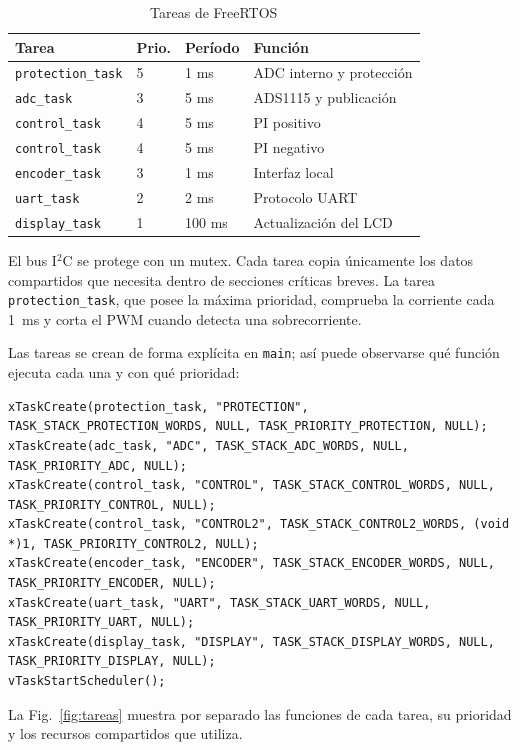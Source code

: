 \documentclass[conference]{IEEEtran}
\begin{document}
\begin{table}[!t]
\caption{Tareas de FreeRTOS}
\label{tab:tareas}
\centering
\scriptsize
\begin{tabular}{@{}llll@{}}
\toprule
\textbf{Tarea} & \textbf{Prio.} & \textbf{Período} & \textbf{Función} \\
\midrule
\texttt{protection\_task} & 5 & 1 ms & ADC interno y protección \\
\texttt{adc\_task} & 3 & 5 ms & ADS1115 y publicación \\
\texttt{control\_task} & 4 & 5 ms & PI positivo \\
\texttt{control\_task} & 4 & 5 ms & PI negativo \\
\texttt{encoder\_task} & 3 & 1 ms & Interfaz local \\
\texttt{uart\_task} & 2 & 2 ms & Protocolo UART \\
\texttt{display\_task} & 1 & 100 ms & Actualización del LCD \\
\bottomrule
\end{tabular}
\end{table}

El bus I$^2$C se protege con un mutex. Cada tarea copia únicamente los datos compartidos que necesita dentro de secciones críticas breves. La tarea \texttt{protection\_task}, que posee la máxima prioridad, comprueba la corriente cada 1~ms y corta el PWM cuando detecta una sobrecorriente.

Las tareas se crean de forma explícita en \texttt{main}; así puede observarse qué función ejecuta cada una y con qué prioridad:

\begin{lstlisting}[caption={Creación de las siete tareas del programa principal.}]
xTaskCreate(protection_task, "PROTECTION", TASK_STACK_PROTECTION_WORDS, NULL, TASK_PRIORITY_PROTECTION, NULL);
xTaskCreate(adc_task, "ADC", TASK_STACK_ADC_WORDS, NULL, TASK_PRIORITY_ADC, NULL);
xTaskCreate(control_task, "CONTROL", TASK_STACK_CONTROL_WORDS, NULL, TASK_PRIORITY_CONTROL, NULL);
xTaskCreate(control_task, "CONTROL2", TASK_STACK_CONTROL2_WORDS, (void *)1, TASK_PRIORITY_CONTROL2, NULL);
xTaskCreate(encoder_task, "ENCODER", TASK_STACK_ENCODER_WORDS, NULL, TASK_PRIORITY_ENCODER, NULL);
xTaskCreate(uart_task, "UART", TASK_STACK_UART_WORDS, NULL, TASK_PRIORITY_UART, NULL);
xTaskCreate(display_task, "DISPLAY", TASK_STACK_DISPLAY_WORDS, NULL, TASK_PRIORITY_DISPLAY, NULL);
vTaskStartScheduler();
\end{lstlisting}

La Fig.~\ref{fig:tareas} muestra por separado las funciones de cada tarea, su prioridad y los recursos compartidos que utiliza.
\end{document}

